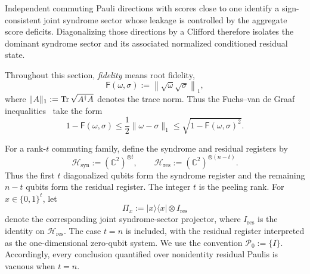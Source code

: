 \documentclass[
  aps,
  prx,
  reprint,
  superscriptaddress,
  amsmath,
  amssymb,
  nofootinbib,
  longbibliography
]{revtex4-2}
\newcommand{\F}{\mathsf{F}}
\newcommand{\Pc}{\mathcal{P}}
\begin{document}
Independent commuting Pauli directions with scores close to one identify a
sign-consistent joint syndrome sector whose leakage is controlled by the
aggregate score deficits.  Diagonalizing those directions by a Clifford
therefore isolates the dominant syndrome sector and its associated normalized
conditioned residual state.

Throughout this section, \emph{fidelity} means root fidelity,
\begin{equation}
\F(\omega,\sigma)
:=
\left\|\sqrt{\omega}\sqrt{\sigma}\right\|_1,
\label{eq:supp-root-fidelity-convention}
\end{equation}
where
$\|A\|_1:=\Tr\sqrt{A^\dagger A}$ denotes the trace norm.  
Thus the Fuchs--van de Graaf inequalities~\cite{FuchsVanDeGraaf1999} take the form
\begin{equation}
1-\F(\omega,\sigma)
\le
\frac12\|\omega-\sigma\|_1
\le
\sqrt{1-\F(\omega,\sigma)^2}.
\label{eq:supp-root-fidelity-fvdg}
\end{equation}

For a rank-$t$ commuting family, define the syndrome and residual registers
by
\begin{equation}
\mathcal H_{\mathrm{syn}}
:=
(\mathbb C^2)^{\otimes t},
\qquad
\mathcal H_{\mathrm{res}}
:=
(\mathbb C^2)^{\otimes(n-t)}.
\label{eq:supp-syndrome-residual-registers}
\end{equation}
Thus the first $t$ diagonalized qubits form the syndrome register and the
remaining $n-t$ qubits form the residual register.
The integer $t$ is the peeling rank.
For $x\in\{0,1\}^t$, let
\begin{equation}
\Pi_x
:=
|x\rangle\!\langle x|\otimes I_{\mathrm{res}}
\label{eq:supp-joint-syndrome-projector}
\end{equation}
denote the corresponding joint syndrome-sector projector, where
$I_{\mathrm{res}}$ is the identity on $\mathcal H_{\mathrm{res}}$.  The case $t=n$
is included, with the residual register interpreted as the one-dimensional
zero-qubit system.  We use the convention $\Pc_0:=\{I\}$. 
Accordingly, every conclusion quantified over nonidentity residual Paulis is
vacuous when $t=n$.
\end{document}

